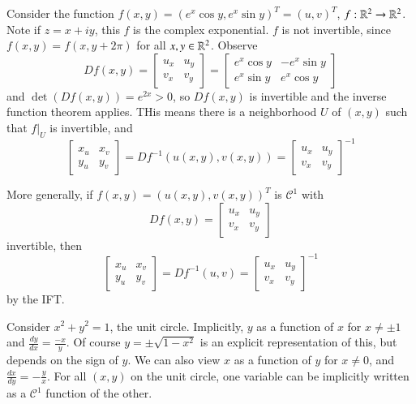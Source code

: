 \begin{eg}
    Consider the function $f(x,y) = (e^x\cos y,e^x\sin y)^T = (u,v)^T$, $f:\mathbb R^2\rightarrow \mathbb R^2$. Note if $z = x+iy$, this $f$ is the complex exponential. $f$ is not invertible, since $f(x,y) = f(x,y+2\pi)$ for all $x,y \in \mathbb R^2$. Observe $$Df(x,y) = \begin{bmatrix} u_x & u_y \\ v_x & v_y \end{bmatrix} = \begin{bmatrix} e^x\cos y & -e^x\sin y \\ e^x\sin y & e^x \cos y\end{bmatrix}$$ and $\det(Df(x,y)) = e^{2x} > 0$, so $Df(x,y)$ is invertible and the inverse function theorem applies. THis means there is a neighborhood $U$ of $(x,y)$ such that $f\vert_U$ is invertible, and $$\begin{bmatrix} x_u & x_v \\ y_u & y_v \end{bmatrix} = Df^{-1}(u(x,y),v(x,y)) = \begin{bmatrix} u_x & u_y \\ v_x & v_y \end{bmatrix}^{-1}$$
\end{eg}

\begin{eg}
    More generally, if $f(x,y) = (u(x,y), v(x,y))^T$ is $\mathcal{C}^1$ with $$Df(x,y) = \begin{bmatrix} u_x & u_y \\ v_x & v_y\end{bmatrix}$$ invertible, then $$\begin{bmatrix} x_u & x_v \\ y_u & y_v \end{bmatrix} = Df^{-1}(u,v) = \begin{bmatrix} u_x & u_y \\ v_x & v_y \end{bmatrix}^{-1}$$ by the IFT.
\end{eg}

\begin{eg}
    Consider $x^2+y^2 = 1$, the unit circle. Implicitly, $y$ as a function of $x$ for $x \neq \pm 1$ and $\frac{dy}{dx} = \frac{-x}{y}$. Of course $y = \pm\sqrt{1-x^2}$ is an explicit representation of this, but depends on the sign of $y$. We can also view $x$ as a function of $y$ for $x \neq 0$, and $\frac{dx}{dy} = -\frac{y}{x}$. For all $(x,y)$ on the unit circle, one variable can be implicitly written as a $\mathcal{C}^1$ function of the other.
\end{eg}

